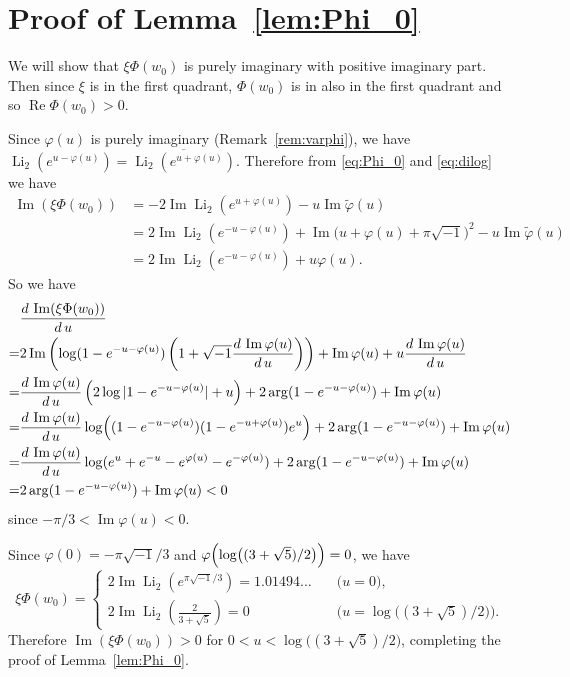 \documentclass[a4paper]{amsart}
\theoremstyle{plain}
\theoremstyle{definition}
\theoremstyle{remark}
\newcommand{\Li}{\operatorname{Li}}
\renewcommand{\Re}{\operatorname{Re}}
\renewcommand{\Im}{\operatorname{Im}}
\numberwithin{equation}{section}
\begin{document}
\section{Proof of Lemma~\ref{lem:Phi_0}}
\label{sec:Phi_0}
We will show that $\xi\Phi(w_0)$ is purely imaginary with positive imaginary part.
Then since $\xi$ is in the first quadrant, $\Phi(w_0)$ is in also in the first quadrant and so $\Re\Phi(w_0)>0$.
\par
Since $\varphi(u)$ is purely imaginary (Remark~\ref{rem:varphi}), we have $\Li_2(e^{u-\varphi(u)})=\overline{\Li_2(e^{u+\varphi(u)})}$.
Therefore from \eqref{eq:Phi_0} and \eqref{eq:dilog} we have
\begin{equation*}
\begin{split}
  \Im(\xi\Phi(w_0))
  &=
  -2\Im\Li_2(e^{u+\varphi(u)})-u\Im\tilde{\varphi}(u)
  \\
  &=
  2\Im\Li_2(e^{-u-\varphi(u)})
  +\Im\bigl(u+\varphi(u)+\pi\sqrt{-1}\bigr)^2
  -u\Im\tilde{\varphi}(u)
  \\
  &=
  2\Im\Li_2(e^{-u-\varphi(u)})
  +u\varphi(u).
\end{split}
\end{equation*}
So we have
\begin{equation*}
\begin{split}
  &\frac{d\,\Im(\xi\Phi(w_0))}{d\,u}
  \\
  =&
  2\Im
  \left(
    \log(1-e^{-u-\varphi(u)})
    \left(
      1
      +
      \sqrt{-1}\frac{d\,\Im\varphi(u)}{d\,u}
    \right)
  \right)
  +\Im\varphi(u)
  +u\frac{d\,\Im\varphi(u)}{d\,u}
  \\
  =&
  \frac{d\,\Im\varphi(u)}{d\,u}
  \left(
    2\log|1-e^{-u-\varphi(u)}|+u
  \right)
  +2\arg(1-e^{-u-\varphi(u)})
  +\Im\varphi(u)
  \\
  =&
  \frac{d\,\Im\varphi(u)}{d\,u}
  \log\Bigl((1-e^{-u-\varphi(u)})(1-e^{-u+\varphi(u)})e^u\Bigr)
  +2\arg(1-e^{-u-\varphi(u)})
  +\Im\varphi(u)
  \\
  =&
  \frac{d\,\Im\varphi(u)}{d\,u}
  \log(e^u+e^{-u}-e^{\varphi(u)}-e^{-\varphi(u)})
  +2\arg(1-e^{-u-\varphi(u)})
  +\Im\varphi(u)
  \\
  =&
  2\arg(1-e^{-u-\varphi(u)})
  +\Im\varphi(u)
  <0
\end{split}
\end{equation*}
since $-\pi/3<\Im\varphi(u)<0$.
\par
Since $\varphi(0)=-\pi\sqrt{-1}/3$ and $\varphi\Bigl(\log\bigl((3+\sqrt{5})/2\bigr)\Bigr)=0$, we have
\begin{equation*}
  \xi\Phi(w_0)
  =
  \begin{cases}
    2\Im\Li_2\left(e^{\pi\sqrt{-1}/3}\right)=1.01494\ldots
    &\quad\text{($u=0$)},
    \\
    2\Im\Li_2\left(\frac{2}{3+\sqrt{5}}\right)=0
    &\quad\text{($u=\log\bigl((3+\sqrt{5})/2\bigr)$)}.
  \end{cases}
\end{equation*}
Therefore $\Im(\xi\Phi(w_0))>0$ for $0<u<\log\bigl((3+\sqrt{5})/2\bigr)$, completing the proof of Lemma~\ref{lem:Phi_0}.


\end{document}
